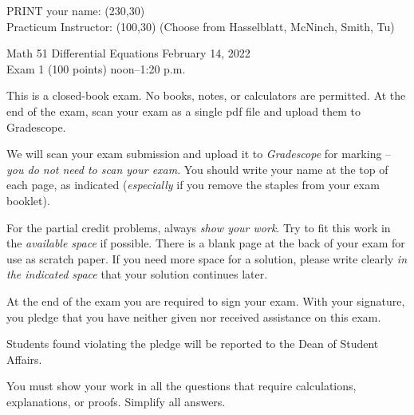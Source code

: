 \documentclass{article}
\begin{document}
\noindent
PRINT your name:  \framebox(230,30){}\\

\smallskip
\noindent
Practicum Instructor: \framebox(100,30){} (Choose from Hasselblatt, McNinch, Smith, Tu)


\begin{center}
Math 51 \hfill Differential Equations \hfill February 14, 2022\\
\hfill Exam 1 (100 points) \hfill noon--1:20 p.m.
\end{center}

\medskip

This is a closed-book exam.  No books, notes, or calculators are
permitted.  At the end of the exam, scan your exam as a single pdf
file and upload them to Gradescope.

We will scan your exam submission and upload it to \emph{Gradescope} for
marking -- \emph{you do not need to scan your exam}. You should write
your name at the top of each page, as indicated (\emph{especially} if you
remove the staples from your exam booklet).

For the partial credit problems, always \emph{show your work}. Try to
fit this work in the \emph{available space} if possible.  There is a
blank page at the back of your exam for use as scratch paper. If you
need more space for a solution, please write clearly \emph{in the
  indicated space} that your solution continues later.

At the end of the exam you are required to sign your exam. With your
signature, you pledge that you have neither given nor received
assistance on this exam.

Students found violating the pledge will be reported to
the Dean of Student Affairs.

You must show your work in all the questions that require
calculations, explanations, or proofs.  Simplify all answers.








\newpage
\end{document}
